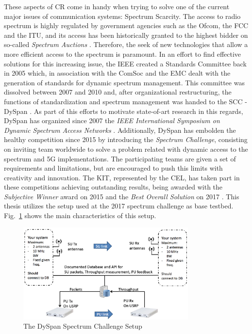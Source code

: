 These aspects of \ac{CR} come in handy when trying to solve one of the current major issues of communication systems: Spectrum Scarcity. The access to radio spectrum is highly regulated by government agencies such as the \ac{Ofcom}, the \ac{FCC} and the \ac{ITU}, and its access has been historically granted to the highest bidder on so-called \emph{Spectrum Auctions} \cite{Jondral2005} \cite{Staple2004}. Therefore, the seek of new technologies that allow a more efficient access to the spectrum is paramount. In an effort to find effective solutions for this increasing issue, the \ac{IEEE} created a Standards Committee back in 2005 which, in association with the \ac{ComSoc} and the \ac{EMC} dealt with the generation of standards for dynamic spectrum management. This committee was dissolved between 2007 and 2010 and, after organizational restructuring, the functions of standardization and spectrum management was handed to the \ac{SCC} - \ac{DySpan} \cite{IEEEDySPAN2015}. As part of this efforts to motivate state-of-art research in this regards, \ac{DySpan} has organized since 2007 the \emph{IEEE International Symposium on Dynamic Spectrum Access Networks} \cite{Comsoc}. Additionally, \ac{DySpan} has embolden the healthy competition since 2015 by introducing the \emph{Spectrum Challenge}, consisting on inviting team worldwide to solve a problem related with dynamic access to the spectrum and 5G implementations. The participating teams are given a set of requirements and limitations, but are encouraged to push this limits with creativity and innovation. The \ac{KIT}, represented by the \ac{CEL}, has taken part in these competitions achieving outstanding results, being awarded with the \emph{Subjective Winner} award on 2015 \cite{Kaushik2015} and the \emph{Best Overall Solution} on 2017 \cite{Wunsch2017a}. This thesis utilizes the setup used at the 2017 spectrum challenge as base testbed. Fig.~\ref{fig:dyspan_setup} shows the main characteristics of this setup.

\begin{figure}[htb]
    \centering
      \includegraphics[width=0.8\textwidth]{figures/dyspan_set.png}
      \caption{The DySpan Spectrum Challenge Setup \cite{Dyspanchalle}}
      \label{fig:dyspan_setup}
\end{figure}

